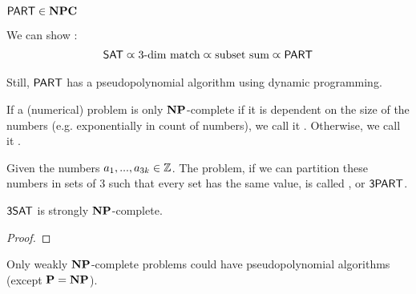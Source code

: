 \begin{theorem}
    $\mathsf{PART} \in \mathbf{NPC}$
\end{theorem}
\begin{sketch}
    We can show \cite[Ch.~15.5]{comb-optimization-korte}:
    \begin{align*}
        \mathsf{SAT} \varpropto \text{3-dim match} \varpropto \text{subset sum} \varpropto \mathsf{PART}
    \end{align*}
\end{sketch}
\begin{remark}
    Still, $\mathsf{PART}$ has a pseudopolynomial algorithm using dynamic programming.
\end{remark}
\begin{definition}
    If a (numerical) problem is only $\mathbf{NP}$-complete if it is dependent on the size
    of the numbers (e.g. exponentially in count of numbers), we call it .
    Otherwise, we call it .
\end{definition}
\begin{definition}
    Given the numbers $a_1,...,a_{3k} \in \mathbb{Z}$. The problem, if we can partition these numbers
    in sets of 3 such that every set has the same value, is called , or $\mathsf{3PART}$.
\end{definition}
\begin{theorem}
    $\mathsf{3SAT}$ is strongly $\mathbf{NP}$-complete.
\end{theorem}
\begin{proof}
\end{proof}
\begin{remark}
    Only weakly $\mathbf{NP}$-complete problems could have pseudopolynomial algorithms (except $\mathbf{P} = \mathbf{NP}$).
\end{remark}